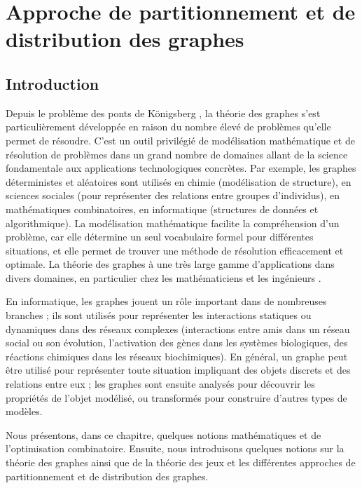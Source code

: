 \chapter{Approche de partitionnement et de distribution des graphes}

\section{Introduction} 
Depuis le problème des ponts de Königsberg \citep{EULER1736}, la théorie des graphes s'est particulièrement développée en raison du nombre élevé de problèmes qu'elle permet de résoudre. C'est un outil privilégié de modélisation mathématique et de résolution de problèmes dans un grand nombre de domaines allant de la science fondamentale aux applications technologiques concrètes. Par exemple, les graphes déterministes et aléatoires sont utilisés en chimie (modélisation de structure), en sciences sociales (pour représenter des relations entre groupes d’individus), en mathématiques combinatoires, en informatique (structures de données et algorithmique). La modélisation mathématique facilite la compréhension d'un problème, car elle détermine un seul vocabulaire formel pour différentes situations, et elle permet de trouver une méthode de résolution efficacement et optimale. La théorie des graphes à une très large gamme d'applications dans divers domaines, en particulier chez les mathématiciens et les ingénieurs \citep{DEO2017}.

En informatique, les graphes jouent un rôle important dans de nombreuses branches ; ils sont utilisés pour représenter les interactions statiques ou dynamiques dans des réseaux complexes (interactions entre amis dans un réseau social ou son évolution, l'activation des gènes dans les systèmes biologiques, des réactions chimiques dans les réseaux biochimiques). En général, un graphe peut être utilisé pour représenter toute situation impliquant des objets discrets et des relations entre eux ; les graphes sont ensuite analysés pour découvrir les propriétés de l'objet modélisé, ou transformés pour construire d'autres types de modèles.

Nous présentons, dans ce chapitre, quelques notions mathématiques et de l'optimisation combinatoire. Ensuite, nous introduisons quelques notions sur la théorie des graphes ainsi que de la théorie des jeux et les différentes approches de partitionnement et de distribution des graphes. 


